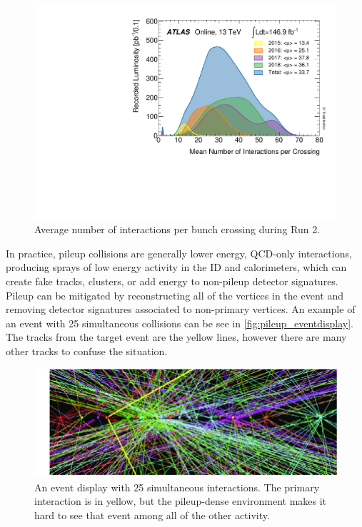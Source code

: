 \begin{figure}[htbp]
\centering
\includegraphics[width=.8\textwidth]{figures/Detector/lhc-mu.pdf}
\caption{Average number of interactions per bunch crossing during Run 2.}
\label{fig:pileup_plot}
\end{figure}

In practice, pileup collisions are generally lower energy, \ac{QCD}-only interactions, producing sprays of low energy activity in the \ac{ID} and calorimeters, which can create fake tracks, clusters, or add energy to non-pileup detector signatures.  Pileup can be mitigated by reconstructing all of the vertices in the event and removing detector signatures associated to non-primary vertices. An example of an event with 25 simultaneous collisions can be see in \autoref{fig:pileup_eventdisplay}. The tracks from the target event are the yellow lines, however there are many other tracks to confuse the situation.


\begin{figure}[htbp]
\centering
\includegraphics[width=.8\textwidth]{figures/Detector/lhc-pileup-eventdisplay.png}
\caption{An event display with 25 simultaneous interactions. The primary interaction is in yellow, but the pileup-dense environment makes it hard to see that event among all of the other activity.}
\label{fig:pileup_eventdisplay}
\end{figure}




